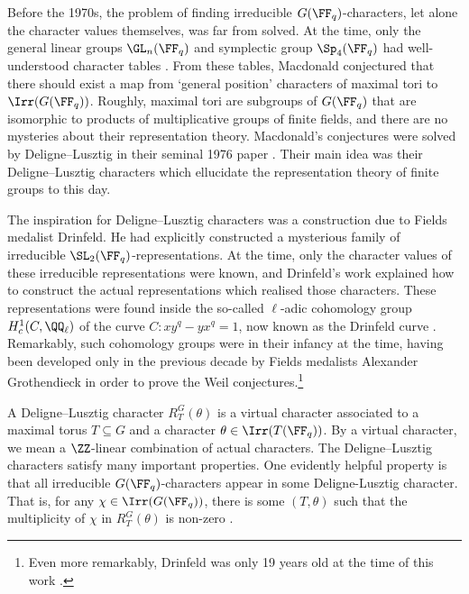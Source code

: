 \documentclass{amsart}
\theoremstyle{plain}
\theoremstyle{definition}
\theoremstyle{remark}
\begin{document}
Before the 1970s, the problem of finding irreducible $G(\FF_q)$-characters, let alone the character values themselves, was far from solved. At the time, only the general linear groups $\GL_n(\FF_q)$ and symplectic group $\Sp_{4}(\FF_q)$ had well-understood character tables \cite{Green55,Srinivasan68}. From these tables, Macdonald conjectured that there should exist a map from `general position' characters of maximal tori to $\Irr(G(\FF_q))$. Roughly, maximal tori are subgroups of $G(\FF_q)$ that are isomorphic to products of multiplicative groups of finite fields, and there are no mysteries about their representation theory. Macdonald's conjectures were solved by Deligne--Lusztig in their seminal 1976 paper \cite{DL76}. Their main idea was their Deligne--Lusztig characters which ellucidate the representation theory of finite groups to this day.  

The inspiration for Deligne--Lusztig characters was a construction due to Fields medalist Drinfeld. He had explicitly constructed a mysterious family of irreducible $\SL_2(\FF_q)$-representations. At the time, only the character values of these irreducible representations were known, and Drinfeld's work explained how to construct the actual representations which realised those characters. These representations were found inside the so-called $\ell$-adic cohomology group $H_c^1(C,\QQ_\ell)$ of the curve $C\colon xy^q-yx^q=1$, now known as the Drinfeld curve \cite{Bonnafe11}. Remarkably, such cohomology groups were in their infancy at the time, having been developed only in the previous decade by Fields medalists Alexander Grothendieck in order to prove the Weil conjectures.\footnote{Even more remarkably, Drinfeld was only 19 years old at the time of this work \cite{Lusztig14}.}

A Deligne--Lusztig character $R_T^G(\theta)$ is a virtual character associated to a maximal torus $T\subseteq G$ and a character $\theta\in\Irr(T(\FF_q))$. By a virtual character, we mean a $\ZZ$-linear combination of actual characters. The Deligne--Lusztig characters satisfy many important properties. One evidently helpful property is that all irreducible $G(\FF_q)$-characters appear in some Deligne-Lusztig character. That is, for any $\chi\in\Irr(G(\FF_q))$, there is some $(T,\theta)$ such that the multiplicity of $\chi$ in $R_T^G(\theta)$ is non-zero \cite[Corollary 2.2.19]{GM20}.
\end{document}
